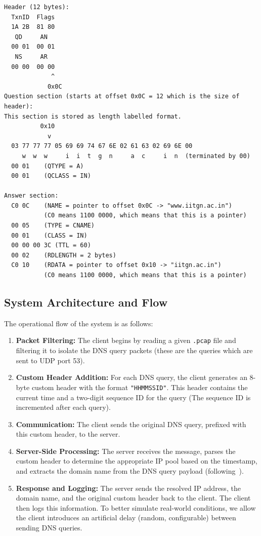 \documentclass{article}
\begin{document}
\begin{lstlisting}
Header (12 bytes):
  TxnID  Flags  
  1A 2B  81 80  
   QD     AN  
  00 01  00 01 
   NS     AR 
  00 00  00 00
             ^
            0x0C                                                         
Question section (starts at offset 0x0C = 12 which is the size of header):
This section is stored as length labelled format. 
          0x10
            v 
  03 77 77 77 05 69 69 74 67 6E 02 61 63 02 69 6E 00
     w  w  w     i  i  t  g  n     a  c     i  n  (terminated by 00)
  00 01    (QTYPE = A)
  00 01    (QCLASS = IN)

Answer section:
  C0 0C    (NAME = pointer to offset 0x0C -> "www.iitgn.ac.in")
           (C0 means 1100 0000, which means that this is a pointer)
  00 05    (TYPE = CNAME)
  00 01    (CLASS = IN)
  00 00 00 3C (TTL = 60)
  00 02    (RDLENGTH = 2 bytes)
  C0 10    (RDATA = pointer to offset 0x10 -> "iitgn.ac.in")
           (C0 means 1100 0000, which means that this is a pointer)
\end{lstlisting}



\subsection{System Architecture and Flow}

The operational flow of the system is as follows:
\begin{enumerate}
    \item \textbf{Packet Filtering:} The client begins by reading a given \texttt{.pcap} file and filtering it to isolate the DNS query packets (these are the queries which are sent to UDP port 53).
    \item \textbf{Custom Header Addition:} For each DNS query, the client generates an 8-byte custom header with the format \texttt{"HHMMSSID"}. This header contains the current time and a two-digit sequence ID for the query (The sequence ID is incremented after each query).
    \item \textbf{Communication:} The client sends the original DNS query, prefixed with this custom header, to the server.
    \item \textbf{Server-Side Processing:} The server receives the message, parses the custom header to determine the appropriate IP pool based on the timestamp, and extracts the domain name from the DNS query payload (following~\cite{rfc1035}).
    \item \textbf{Response and Logging:} The server sends the resolved IP address, the domain name, and the original custom header back to the client. The client then logs this information. To better simulate real-world conditions, we allow the client introduces an artificial delay (random, configurable) between sending DNS queries.
\end{enumerate}
\end{document}
